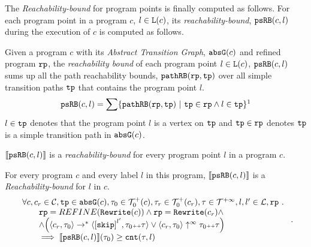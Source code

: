 The \emph{Reachability-bound} for program points is finally computed as follows.
For each program point in a program $c$, $l \in \mathtt{L}(c)$,
its \emph{reachability-bound}, $\mathtt{psRB}(c, l)$ during the execution of $c$ is computed as follows.
%
\begin{defn}
\label{def:point_psrb}
Given a program $c$ with its \emph{Abstract Transition Graph}, $\mathtt{abs}{\mathtt{G}}(c)$ and refined program $\mathtt{rp}$,
the \emph{reachability bound} of each program point $l \in \mathtt{L}(c)$, $\mathtt{psRB}(c, l)$ 
sums up all the path reachability bounds, $\mathtt{pathRB}(\mathtt{rp}, \mathtt{tp})$ over all simple transition paths $\mathtt{tp}$ that contains the program point $l$.
\[ 
  \psRB(c, l) = 
  \sum
  \left\{ \inoutB(\rprog, \tpath) ~\vert~ \tpath \in \rprog \land 
  l \in \tpath \right\}\footnotemark
\]
$l \in \mathtt{tp}$ denotes that the program point $l$ is a vertex on $\mathtt{tp}$ 
and $\mathtt{tp} \in \mathtt{rp}$ denotes $\mathtt{tp}$ is a simple transition path in $\mathtt{abs}{\mathtt{G}}(c)$.
\end{defn}
$\llbracket \mathtt{psRB}(c, l) \rrbracket$ is a \emph{reachability-bound} for every program point $l$ in a program $c$.
\begin{thm}
\label{thm:pathsensitive_rb_soundness}
For every program ${c}$ and every label $l$ in this program,
$\llbracket \mathtt{psRB}(c, l) \rrbracket$ is a \emph{Reachability-bound} for $l$ in $c$.
%
{\small
\[
  \begin{array}{l}
    \forall c, c_r \in \cdom, \tpath \in \absG(c), \trace_0 \in \ftdom_0(c),  \trace_r \in \ftdom_0(c_r), \trace \in \tdom, l, l' \in \ldom, \rprog \st 
    \\ \qquad
    \rprog = REFINE(\algrewrite(c))
    \land 
    \rprog = \algrewrite(c_r)
    \land
    \\ \qquad
    \land
    \Big(
    \config{c_r, \trace_0} \rightarrow^* \config{\clabel{\eskip}^{l'}, \trace_0 \tracecat \trace}
    \lor \config{c_r, \trace_0} \uparrow^{\infty} \trace_0 \tracecat \trace 
    \Big)
    \\ \qquad
    \implies \econfig{\psRB(c, l)}(\trace_0) \geq \counter(\trace, l)
  \end{array}.
\]
}
\end{thm}